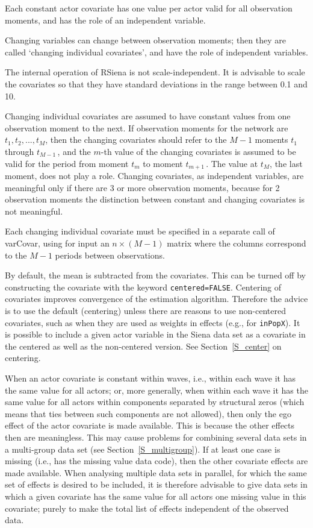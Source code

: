 \documentclass[a4paper,fleqn,11pt]{article}
\newcommand{\+}{\, + \,}
\newcommand{\sfn}[1]{\textsf{#1}}
\newcommand{\RS}{{\sf \textsf{RSiena} }}
\begin{document}
Each constant actor covariate has one value per actor
valid for all observation moments, and has the role of an
independent variable.

Changing variables can change between observation moments;
then they are called `changing individual covariates',
and have the role of independent variables.

The internal operation of \RS is not scale-independent.
It is advisable to scale the covariates so that they have
standard deviations in the range between 0.1 and 10.

Changing individual covariates are assumed to have constant values from one
observation moment to the next. If observation moments for the
network are $t_1, t_2, ..., t_M$, then the changing covariates
should refer to the $M-1$ moments $t_1$ through $t_{M-1}\,$, and
the $m$-th value of the changing covariates is assumed to be valid
for the period from moment $t_m$ to moment $t_{m+1}\,$.
The value at $t_M$, the last moment, does not play a role.
Changing covariates, as independent variables, are meaningful
only if there are 3 or more observation moments,
because for 2 observation moments the distinction between
constant and changing covariates is not meaningful.

Each changing individual covariate must be specified
in a separate call of \sfn{varCovar}, using for input
an $n \times (M-1)$ matrix where the columns correspond to the $M-1$ periods
between observations.

By default, the mean is subtracted from the covariates.
This can be turned off by constructing the covariate with the keyword
\texttt{centered=FALSE}. Centering of covariates improves
convergence of the estimation algorithm.
Therefore the advice is to use the default (centering) unless there are reasons to
use non-centered covariates, such as when they are used as weights in effects
(e.g., for \texttt{inPopX}).
It is possible to include a given actor variable in the Siena data set
as a covariate in the centered as well as the non-centered version.
See Section~\ref{S_center} on centering.

\iffalse
When an actor covariate is constant within waves, i.e.,
within each wave it has the same value for all actors;
or, more generally, when within each wave it has the same value for
all actors
within components separated by structural zeros (which means that
ties between such components are not allowed), then only the ego effect
of the actor covariate is made available.
This is because the other effects then are meaningless.
This may cause problems for combining several data sets
in a multi-group data set (see Section~\ref{S_multigroup}).
If at least one case is missing (i.e., has the missing value data code),
then the other covariate effects are made available.
When analysing multiple data sets in parallel,
for which the same set of effects is desired to be included,
it is therefore advisable to give data sets in which
a given covariate has the same value for all actors
one missing value in this covariate; purely to make
the total list of effects independent of the observed data.
\end{document}
